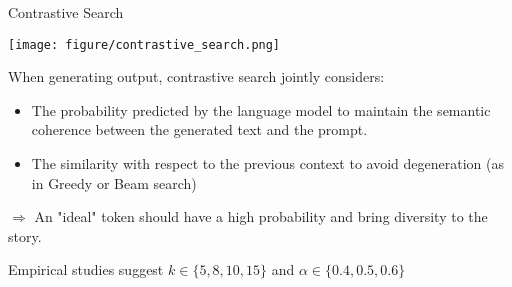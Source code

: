 \begin{frame}{Contrastive Search }

\begin{center}
    \texttt{[image: figure/contrastive\_search.png]}
\end{center}     

When generating output, contrastive search jointly considers:
\begin{itemize}
    \item The probability predicted by the language model to maintain the semantic coherence between the generated text and the prompt.
    \item The similarity with respect to the previous context to avoid  degeneration (as in Greedy or Beam search)
\end{itemize}
   
$\Rightarrow$ An "ideal" token should have a high probability and bring diversity to the story.

Empirical studies suggest $k \in \{5, 8, 10, 15\}$ and $\alpha \in \{0.4, 0.5, 0.6\}$   

\vfill

\end{frame}


